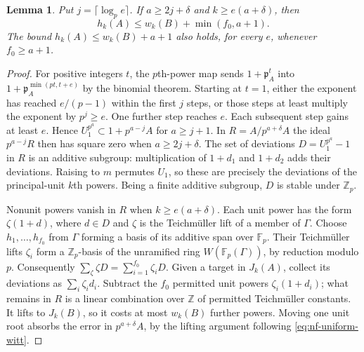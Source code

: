 \documentclass[11pt,letterpaper]{article}
\newtheorem{lemma}[lemma]{Lemma}
\theoremstyle{definition}
\numberwithin{equation}{section}
\begin{document}
\begin{lemma}\label{lem:linear-local-deviation}
Put $j=\lceil\log_p e\rceil$. If $a\ge2j+\delta$ and
$k\ge e(a+\delta)$, then
\[
                 h_k(A)\le w_k(B)+\min(f_0,a+1).
\]
The bound $h_k(A)\le w_k(B)+a+1$ also holds, for every $e$, whenever
$f_0\ge a+1$.
\end{lemma}
\begin{proof}
For positive integers $t$, the $p$th-power map sends
$1+\mathfrak p_A^t$ into
$1+\mathfrak p_A^{\min(pt,t+e)}$ by the binomial theorem.
Starting at $t=1$, either the exponent has reached $e/(p-1)$
within the first $j$ steps, or those steps at least multiply the
exponent by $p^j\ge e$. One further step reaches $e$.
Each subsequent step gains at least $e$. Hence
$U_1^{p^a}\subset 1+p^{a-j}A$ for $a\ge j+1$.
In $R=A/p^{a+\delta}A$ the ideal $p^{a-j}R$ then has square zero
when $a\ge2j+\delta$.
The set of deviations $D=U_1^{p^a}-1$ in $R$ is an additive subgroup:
multiplication of $1+d_1$ and $1+d_2$ adds their deviations.
Raising to $m$ permutes $U_1$, so these are precisely the deviations
of the principal-unit $k$th powers. Being a finite additive subgroup,
$D$ is stable under $\mathbb Z_p$.

Nonunit powers vanish in $R$ when $k\ge e(a+\delta)$.
Each unit power has the form $\zeta(1+d)$, where $d\in D$ and
$\zeta$ is the Teichm\"uller lift of a member of $\Gamma$.
Choose $h_1,\ldots,h_{f_0}$ from $\Gamma$ forming a basis of its
additive span over $\mathbb F_p$. Their Teichm\"uller lifts
$\zeta_i$ form a $\mathbb Z_p$-basis of the unramified ring
$W(\mathbb F_p(\Gamma))$, by reduction modulo $p$. Consequently
$\sum_{\zeta}\zeta D=\sum_{i=1}^{f_0}\zeta_iD$.
Given a target in $J_k(A)$, collect its deviations as
$\sum_i\zeta_i d_i$. Subtract the $f_0$ permitted unit powers
$\zeta_i(1+d_i)$; what remains in $R$ is a linear combination over
$\mathbb Z$ of permitted Teichm\"uller constants. It lifts to
$J_k(B)$, so it costs at most $w_k(B)$ further powers. Moving one
unit root absorbs the error in $p^{a+\delta}A$, by the lifting
argument following \eqref{eq:nf-uniform-witt}.


\end{proof}
\end{document}

